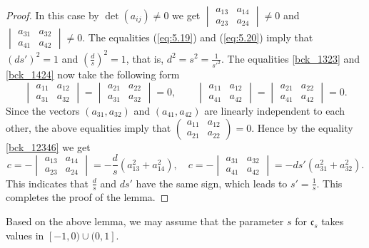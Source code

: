 \documentclass{amsart}
\numberwithin{equation}{section}
\theoremstyle{definition}
\renewcommand{\1}{\mathds{1}}
\renewcommand{\>}{\rightarrow}
\begin{document}
\begin{proof}
In this case by $\det(a_{ij})\neq 0$ we get $\begin{vmatrix}a_{13} & a_{14} \\ a_{23} & a_{24} \end{vmatrix} \neq 0$ and $
\begin{vmatrix}a_{31} & a_{32} \\ a_{41} & a_{42} \end{vmatrix} \neq 0$.
The equalities (\ref{eq:5.19}) and (\ref{eq:5.20}) imply that  $(ds')^2=1$ and $(\frac{d}{s})^2=1$, that is, $d^2=s^2=\frac{1}{s'^2}$.
The equalities \eqref{bck_1323} and \eqref{bck_1424} now take the following form
\[\begin{vmatrix}a_{11} & a_{12} \\ a_{31} & a_{32} \end{vmatrix}=\begin{vmatrix}a_{21} & a_{22} \\ a_{31} & a_{32} \end{vmatrix}=0,\quad \quad
\begin{vmatrix}a_{11} & a_{12} \\ a_{41} & a_{42} \end{vmatrix}=\begin{vmatrix}a_{21} & a_{22} \\ a_{41} & a_{42} \end{vmatrix}=0.\]
Since the vectors $(a_{31}, a_{32})$ and $(a_{41},a_{42})$ are linearly independent to each other, the above equalities imply that
$\begin{pmatrix}a_{11} & a_{12} \\ a_{21} & a_{22} \end{pmatrix} =0$. Hence by the equality \eqref{bck_12346} we get
\[c=-\begin{vmatrix}a_{13} & a_{14} \\ a_{23} & a_{24} \end{vmatrix} = - \frac{d}{s}(a_{13}^2+a_{14}^2),
\quad c=-\begin{vmatrix}a_{31} & a_{32} \\ a_{41} & a_{42} \end{vmatrix} = -ds'(a_{31}^2+a_{32}^2).\]
This indicates that $\frac{d}{s}$ and $ds'$ have the same sign, which leads to $s'=\frac{1}{s}$. This completes the proof of the lemma.
\end{proof}

Based on the above lemma, we may assume that the parameter $s$ for $\mathfrak{c}_s$ takes values in $[-1,0)\cup (0,1]$.
\end{document}
